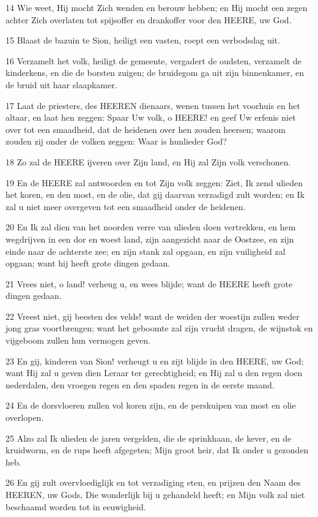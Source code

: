 \par 14 Wie weet, Hij mocht Zich wenden en berouw hebben; en Hij mocht een zegen achter Zich overlaten tot spijsoffer en drankoffer voor den HEERE, uw God.
\par 15 Blaast de bazuin te Sion, heiligt een vasten, roept een verbodsdag uit.
\par 16 Verzamelt het volk, heiligt de gemeente, vergadert de oudsten, verzamelt de kinderkens, en die de borsten zuigen; de bruidegom ga uit zijn binnenkamer, en de bruid uit haar slaapkamer.
\par 17 Laat de priesters, des HEEREN dienaars, wenen tussen het voorhuis en het altaar, en laat hen zeggen: Spaar Uw volk, o HEERE! en geef Uw erfenis niet over tot een smaadheid, dat de heidenen over hen zouden heersen; waarom zouden zij onder de volken zeggen: Waar is hunlieder God?
\par 18 Zo zal de HEERE ijveren over Zijn land, en Hij zal Zijn volk verschonen.
\par 19 En de HEERE zal antwoorden en tot Zijn volk zeggen: Ziet, Ik zend ulieden het koren, en den most, en de olie, dat gij daarvan verzadigd zult worden; en Ik zal u niet meer overgeven tot een smaadheid onder de heidenen.
\par 20 En Ik zal dien van het noorden verre van ulieden doen vertrekken, en hem wegdrijven in een dor en woest land, zijn aangezicht naar de Oostzee, en zijn einde naar de achterste zee; en zijn stank zal opgaan, en zijn vuiligheid zal opgaan; want hij heeft grote dingen gedaan.
\par 21 Vrees niet, o land! verheug u, en wees blijde; want de HEERE heeft grote dingen gedaan.
\par 22 Vreest niet, gij beesten des velds! want de weiden der woestijn zullen weder jong gras voortbrengen; want het geboomte zal zijn vrucht dragen, de wijnstok en vijgeboom zullen hun vermogen geven.
\par 23 En gij, kinderen van Sion! verheugt u en zijt blijde in den HEERE, uw God; want Hij zal u geven dien Leraar ter gerechtigheid; en Hij zal u den regen doen nederdalen, den vroegen regen en den spaden regen in de eerste maand.
\par 24 En de dorsvloeren zullen vol koren zijn, en de perskuipen van most en olie overlopen.
\par 25 Alzo zal Ik ulieden de jaren vergelden, die de sprinkhaan, de kever, en de kruidworm, en de rups heeft afgegeten; Mijn groot heir, dat Ik onder u gezonden heb.
\par 26 En gij zult overvloediglijk en tot verzadiging eten, en prijzen den Naam des HEEREN, uw Gods, Die wonderlijk bij u gehandeld heeft; en Mijn volk zal niet beschaamd worden tot in eeuwigheid.
